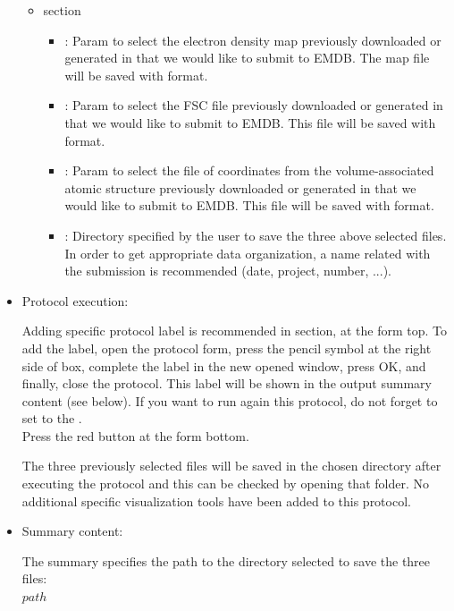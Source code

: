 \begin{itemize}
    \begin{itemize}
     \item {} section

    \begin{itemize}
     \item {}: Param to select the electron density map previously downloaded or generated in \scipion that we would like to submit to EMDB. The map file will be saved with  format.
     \item {}: Param to select the FSC file previously downloaded or generated in \scipion that we would like to submit to EMDB. This file will be saved with  format.
     \item {}: Param to select the file of coordinates from the volume-associated atomic structure previously downloaded or generated in \scipion that we would like to submit to EMDB. This file will be saved with  format.
     \item {}: Directory specified by the user to save the three above selected files. In order to get appropriate data organization, a name related with the submission is recommended (date, project, number, ...).
    \end{itemize}
   \end{itemize}

  \item Protocol execution:
  
  Adding specific protocol label is recommended in  section, at the form top. To add the label, open the protocol form, press the pencil symbol at the right side of  box, complete the label in the new opened window, press OK, and finally, close the protocol. This label will be shown in the output summary content (see below). If you want to run again this protocol, do not forget to set to  the .\\
  Press the  red button at the form bottom.
  
  The three previously selected files will be saved in the chosen directory after executing the protocol and this can be checked by opening that folder. No additional specific visualization tools have been added to this protocol.

  \item Summary content:
  
   The summary specifies the path to the directory selected to save the three files:\\
    $path$
    
\end{itemize}





